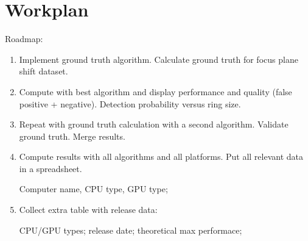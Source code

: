 \section{Workplan}



Roadmap: 

\begin{enumerate}

    \item Implement ground truth algorithm. Calculate ground truth for focus plane shift dataset.

    \item Compute with best algorithm and display performance and quality (false positive + negative). Detection probability versus ring size.

    \item Repeat with ground truth calculation with a second algorithm. Validate ground truth. Merge results. 

    \item Compute results with all algorithms and all platforms. Put all relevant data in a spreadsheet.

        Computer name, CPU type, GPU type;

    \item Collect extra table with release data:

        CPU/GPU types; release date; theoretical max performace; 

\end{enumerate}




